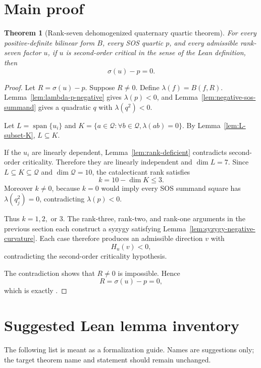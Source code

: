 \documentclass[11pt]{article}
\newtheorem{theorem}{Theorem}[section]
\newcommand{\Quad}{\mathcal Q}
\newcommand{\Span}{\operatorname{span}}
\newcommand{\lean}[1]{\texttt{\detokenize{#1}}}
\begin{document}
\section{Main proof}

\begin{theorem}[Rank-seven dehomogenized quaternary quartic theorem]\label{thm:main}
For every positive-definite bilinear form \(B\), every SOS quartic \(p\), and every admissible rank-seven factor \(u\), if \(u\) is second-order critical in the sense of the Lean definition, then
\[
\sigma(u)-p=0.
\]
\end{theorem}

\begin{proof}
Let \(R=\sigma(u)-p\).  Suppose \(R\ne0\).  Define \(\lambda(f)=B(f,R)
\).  Lemma~\ref{lem:lambda-p-negative} gives \(\lambda(p)<0\), and Lemma~\ref{lem:negative-sos-summand} gives a quadratic \(q\) with \(\lambda(q^2)<0\).

Let \(L=\Span\{u_i\}\) and \(K=\{a\in\Quad: \forall b\in\Quad,\lambda(ab)=0\}\).  By Lemma~\ref{lem:L-subset-K}, \(L\subseteq K\).

If the \(u_i\) are linearly dependent, Lemma~\ref{lem:rank-deficient} contradicts second-order criticality.  Therefore they are linearly independent and \(\dim L=7\).  Since \(L\subseteq K\subseteq\Quad\) and \(\dim\Quad=10\), the catalecticant rank satisfies
\[
k=10-
\dim K\le3.
\]
Moreover \(k\ne0\), because \(k=0\) would imply every SOS summand square has \(\lambda(q_j^2)=0\), contradicting \(\lambda(p)<0\).

Thus \(k=1,2,\) or \(3\).  The rank-three, rank-two, and rank-one arguments in the previous section each construct a syzygy satisfying Lemma~\ref{lem:syzygy-negative-curvature}.  Each case therefore produces an admissible direction \(v\) with
\[
H_u(v)<0,
\]
contradicting the second-order criticality hypothesis.

The contradiction shows that \(R\ne0\) is impossible.  Hence
\[
R=\sigma(u)-p=0,
\]
which is exactly \lean{residual p u = 0}.
\end{proof}

\section{Suggested Lean lemma inventory}

The following list is meant as a formalization guide.  Names are suggestions only; the target theorem name and statement should remain unchanged.
\end{document}
